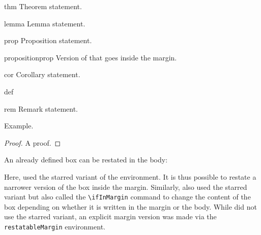 \documentclass[
  b5paper,
  fontsize = 11pt,
  english,
  roman equations,
]{thesis}
\begin{document}
  \begin{theorem*}{thm}
    Theorem statement.
  \end{theorem*}
  \begin{lemma}{lemma}
    Lemma statement.
  \end{lemma}
  \begin{proposition}{prop}
    Proposition statement.
  \end{proposition}
  \begin{restatableMargin}{proposition}{prop}
    Version of  that goes inside the margin.
  \end{restatableMargin}
  \begin{corollary}{cor}
    Corollary statement.
  \end{corollary}
  \begin{definition*}{def}
  \end{definition*}
  \begin{remark}{rem}
    Remark statement.
  \end{remark}
  \begin{example}{ex}
    Example.
  \end{example}
  \begin{proof}
    A proof.
  \end{proof}

  An already defined box can be restated in the body:


  Here,  used the starred variant of the environment.
  It is thus possible to restate a narrower version of the box inside the margin.
%
  Similarly,  also used the starred variant but also called the \verb!\ifInMargin! command to change the content of the box depending on whether it is written in the margin or the body.
  While  did not use the starred variant, an explicit margin version was made via the \verb!restatableMargin! environment.
%
\end{document}
